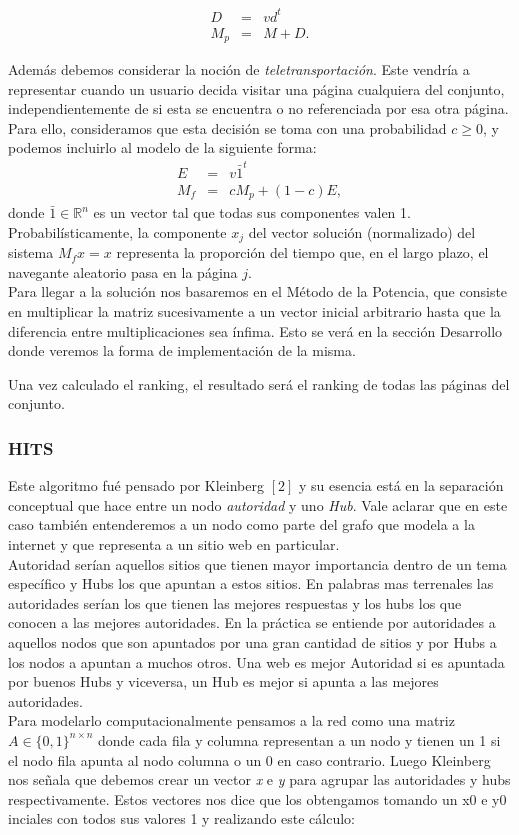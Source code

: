 \begin{eqnarray*}
D & = & v d^t \\
M_p & = & M + D.
\end{eqnarray*}
 

Además debemos considerar la noción de \emph{teletransportación}. Este vendría a representar cuando un usuario  decida visitar
una p\'agina cualquiera del conjunto, independientemente de si esta se encuentra o no referenciada por esa otra página. Para ello, consideramos que esta decisi\'on se toma con una probabilidad
$c \ge 0$, y podemos incluirlo al modelo de la siguiente forma:
\begin{eqnarray*}
E & = & v \bar{1}^t \\
M_f & = & cM_p + (1-c)E,
\end{eqnarray*}
\noindent donde $\bar{1} \in \mathbb{R}^n$ es un vector tal que todas sus componentes valen 1. Probabil\'isticamente, la
componente $x_j$ del vector soluci\'on (normalizado) del sistema $M_f x = x$ representa la proporci\'on del tiempo que,
en el largo plazo, el navegante aleatorio pasa en la p\'agina $j$. \\
Para llegar a la solución nos basaremos en el Método de la Potencia, que consiste en multiplicar la matriz sucesivamente a un vector inicial arbitrario hasta que la diferencia entre multiplicaciones sea ínfima. Esto se verá en la sección Desarrollo donde veremos la forma de implementación de la misma.


Una vez calculado el ranking, el resultado será el ranking de todas las páginas del conjunto.


\subsubsection{HITS}

Este algoritmo fué pensado por Kleinberg $[2]$ y su esencia está en la separación conceptual que hace entre un nodo \textit{autoridad} y uno \textit{Hub}. Vale aclarar que en este caso también entenderemos a un nodo como parte del grafo que modela a la internet y que representa a un sitio web en particular. \\
Autoridad serían aquellos sitios que tienen mayor importancia dentro de un tema específico y Hubs los que apuntan a estos sitios. En palabras mas terrenales las autoridades serían los que tienen las mejores respuestas y los hubs los que conocen a las mejores autoridades.
En la práctica se entiende por autoridades a aquellos nodos que son apuntados por una gran cantidad de sitios y por Hubs a los nodos a apuntan a muchos otros. Una web es mejor Autoridad si es apuntada por buenos Hubs y viceversa, un Hub es mejor si apunta a las mejores autoridades.\\
Para modelarlo computacionalmente pensamos a la red como una matriz $A \in \{0,1\}^{n \times n}$ donde cada fila y columna representan a un nodo y tienen un 1 si el nodo fila apunta al nodo columna o un 0 en caso contrario. Luego Kleinberg nos señala que debemos crear un vector \textit{x} e \textit{y} para agrupar las autoridades y hubs respectivamente. Estos vectores nos dice que los obtengamos tomando un x0 e y0 inciales con todos sus valores 1 y realizando este cálculo:

